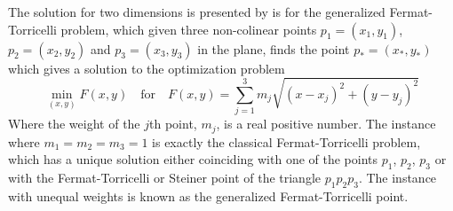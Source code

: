 The solution for two dimensions is presented by \textcite{uteshev2014} is for
the generalized Fermat-Torricelli problem, which given three non-colinear points
$p_1 = (x_1, y_1)$, $p_2 = (x_2, y_2)$ and $p_3 = (x_3, y_3)$ in the plane,
finds the point $p_\ast = (x_\ast, y_\ast)$ which gives a solution to the
optimization problem
%
\begin{equation}
  \min_{(x,y)} F(x,y) \quad \text{for} \quad F(x,y) = \sum_{j=1}^3 m_j
  \sqrt{{(x-x_j)}^2 + {(y-y_j)}^2}
\end{equation}
%
Where the weight of the $j$th point, $m_j$, is a real positive number. The
instance where $m_1 = m_2 = m_3 = 1$ is exactly the classical Fermat-Torricelli
problem, which has a unique solution either coinciding with one of the points
$p_1$, $p_2$, $p_3$ or with the Fermat-Torricelli or Steiner point of the
triangle $p_1 p_2 p_3$. The instance with unequal weights is known as the
generalized Fermat-Torricelli point.

